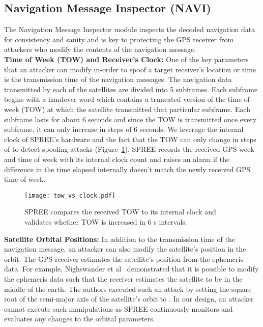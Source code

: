 \documentclass[letterpaper,twocolumn,10pt]{article}
\newcommand{\rxname}{SPREE\xspace}
\begin{document}
\subsection{Navigation Message Inspector (NAVI)}
\label{sec:nav-message-inspection}

The Navigation Message Inspector module inspects the decoded navigation data for consistency and sanity and is key to protecting the GPS receiver from attackers who modify the contents of the navigation message. \\

\noindent\textbf{Time of Week (TOW) and Receiver's Clock:}  One of the key parameters that an attacker can modify in-order to spoof a target receiver's location or time is the transmission time of the navigation messages. The navigation data transmitted by each of the satellites are divided into 5 subframes. Each subframe begins with a handover word which contains a truncated version of the time of week (TOW) at which the satellite transmitted that particular subframe. Each subframe lasts for about 6 seconds and since the TOW is transmitted once every subframe, it can only increase in steps of 6 seconds. We leverage the internal clock of \rxname's hardware and the fact that the TOW can only change in steps of  to detect spoofing attacks (Figure~\ref{fig:tow_clock}). \rxname records the received GPS week and time of week with its internal clock count and raises an alarm if the difference in the time elapsed internally doesn't match the newly received GPS time of week. \\

\begin{figure}[t]
\centering
  \texttt{[image: tow\_vs\_clock.pdf]}
  \caption{\rxname compares the received TOW to its internal clock and validates whether TOW is increased in 6 s intervals.}
  \label{fig:tow_clock}
\end{figure}
\noindent\textbf{Satellite Orbital Positions:} In addition to the transmission time of the navigation message, an attacker can also modify the satellite's position in the orbit. The GPS receiver estimates the satellite's position from the ephemeris data. For example, Nighswander et al~\cite{NighswanderCCS2012} demonstrated that it is possible to modify the ephemeris data such that the receiver estimates the satellite to be in the middle of the earth. The authors executed such an attack by setting the square root of the semi-major axis of the satellite’s orbit to . In our design, an attacker cannot execute such manipulations as \rxname continuously monitors and evaluates any changes to the orbital parameters.\\
\end{document}
